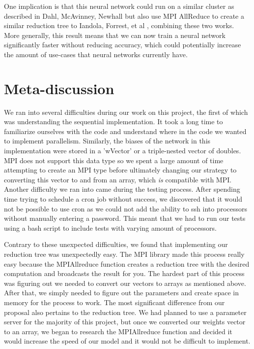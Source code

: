 \documentclass[11pt,twocolumn]{article}
\begin{document}
One implication is that this neural network could run on a similar cluster as described in Dahl, McAvinney, Newhall \cite{dahl:NNCluster} but also use MPI All\textunderscore Reduce to create a similar reduction tree to Iandola, Forrest, et al \cite{iandola2016firecaffe}, combining these two works. More generally, this result means that we can now train a neural network significantly faster without reducing accuracy, which could potentially increase the amount of use-cases that neural networks currently have.

\section{Meta-discussion}\label{meta} 
 
We ran into several difficulties during our work on this project, the first of which was understanding the sequential implementation. It took a long time to familiarize ourselves with the code and understand where in the code we wanted to implement parallelism. Similarly, the biases of the network in this implementation were stored in a 'wVector' or a triple-nested vector of doubles. MPI does not support this data type so we spent a large amount of time attempting to create an MPI type before ultimately changing our strategy to converting this vector to and from an array, which \emph{is} compatible with MPI. Another difficulty we ran into came during the testing process. After spending time trying to schedule a cron job without success, we discovered that it would not be possible to use cron as we could not add the ability to ssh into processors without manually entering a password. This meant that we had to run our tests using a bash script to include tests with varying amount of processors.

Contrary to these unexpected difficulties, we found that implementing our reduction tree was unexpectedly easy. The MPI library made this process really easy because the MPI\textunderscore Allreduce function creates a reduction tree with the desired computation and broadcasts the result for you. The hardest part of this process was figuring out we needed to convert our vectors to arrays as mentioned above. After that, we simply needed to figure out the parameters and create space in memory for the process to work. The most significant difference from our proposal also pertains to the reduction tree. We had planned to use a parameter server for the majority of this project, but once we converted our weights vector to an array, we began to research the MPI\textunderscore Allreduce function and decided it would increase the speed of our model and it would not be difficult to implement. 






\end{document}
